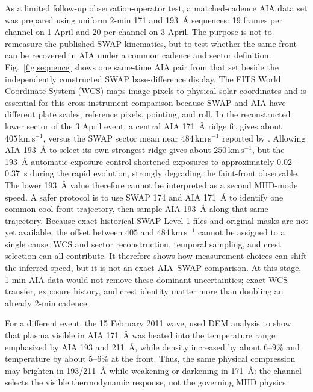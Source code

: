 \documentclass[11pt]{article}
\let\textcite\citet
\newcommand{\kms}{\mathrm{km\,s^{-1}}}
\begin{document}
As a limited follow-up observation-operator test, a matched-cadence AIA data set was prepared using uniform 2-min 171 and 193~\AA{} sequences: 19 frames per channel on 1 April and 20 per channel on 3 April. The purpose is not to remeasure the published SWAP kinematics, but to test whether the same front can be recovered in AIA under a common cadence and sector definition. Fig.~\ref{fig:sequence} shows one same-time AIA pair from that set beside the independently constructed SWAP base-difference display. The FITS World Coordinate System (WCS) maps image pixels to physical solar coordinates and is essential for this cross-instrument comparison because SWAP and AIA have different plate scales, reference pixels, pointing, and roll. In the reconstructed lower sector of the 3 April event, a central AIA 171~\AA{} ridge fit gives about $405\,\kms$, versus the SWAP sector mean near $484\,\kms$ reported by \textcite{OHara2019}. Allowing AIA 193~\AA{} to select its own strongest ridge gives about $250\,\kms$, but the 193~\AA{} automatic exposure control shortened exposures to approximately 0.02--0.37~s during the rapid evolution, strongly degrading the faint-front observable. The lower 193~\AA{} value therefore cannot be interpreted as a second MHD-mode speed. A safer protocol is to use SWAP 174 and AIA 171~\AA{} to identify one common cool-front trajectory, then sample AIA 193~\AA{} along that same trajectory. Because exact historical SWAP Level-1 files and original masks are not yet available, the offset between $405$ and $484\,\kms$ cannot be assigned to a single cause: WCS and sector reconstruction, temporal sampling, and crest selection can all contribute. It therefore shows how measurement choices can shift the inferred speed, but it is not an exact AIA--SWAP comparison. At this stage, 1-min AIA data would not remove these dominant uncertainties; exact WCS transfer, exposure history, and crest identity matter more than doubling an already 2-min cadence.

For a different event, the 15 February 2011 wave, \textcite{Vanninathan2015} used DEM analysis to show that plasma visible in AIA 171~\AA{} was heated into the temperature range emphasized by AIA 193 and 211~\AA{}, while density increased by about 6--9\% and temperature by about 5--6\% at the front. Thus, the same physical compression may brighten in 193/211~\AA{} while weakening or darkening in 171~\AA{}: the channel selects the visible thermodynamic response, not the governing MHD physics.
\end{document}
